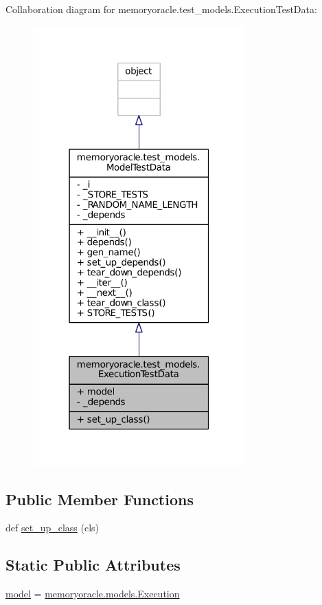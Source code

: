 Collaboration diagram for memoryoracle.\+test\+\_\+models.\+Execution\+Test\+Data\+:\nopagebreak
\begin{figure}[H]
\begin{center}
\leavevmode
\includegraphics[width=232pt]{classmemoryoracle_1_1test__models_1_1ExecutionTestData__coll__graph}
\end{center}
\end{figure}
\subsection*{Public Member Functions}
\begin{DoxyCompactItemize}
\item 
def \hyperlink{classmemoryoracle_1_1test__models_1_1ExecutionTestData_aee8f3379c92809ba79acff8c1cac48c9}{set\+\_\+up\+\_\+class} (cls)
\end{DoxyCompactItemize}
\subsection*{Static Public Attributes}
\begin{DoxyCompactItemize}
\item 
\hyperlink{classmemoryoracle_1_1test__models_1_1ExecutionTestData_a6e5285d5b3b3ff2443ec195959d31213}{model} = \hyperlink{classmemoryoracle_1_1models_1_1Execution}{memoryoracle.\+models.\+Execution}
\end{DoxyCompactItemize}
